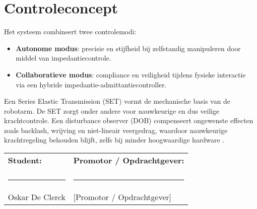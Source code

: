 \documentclass[11pt,a4paper]{article}
\begin{document}
\section*{Controleconcept}
Het systeem combineert twee controlemodi:  

\begin{itemize}
    \item \textbf{Autonome modus}: precisie en stijfheid bij zelfstandig manipuleren door middel van impedantiecontrole.  
    \item \textbf{Collaboratieve modus}: compliance en veiligheid tijdens fysieke interactie via een hybride impedantie-admittantiecontroller.
\end{itemize}

Een Series Elastic Transmission (SET) vormt de mechanische basis van de robotarm. De SET zorgt onder andere voor nauwkeurige en dus veilige krachtcontrole. Een disturbance observer (DOB) compenseert ongewenste effecten zoals backlash, wrijving en niet-lineair veergedrag, waardoor nauwkeurige krachtregeling behouden blijft, zelfs bij minder hoogwaardige hardware \cite{Paine2016_SEA}\cite{Shim2021_DO}.  



\vspace{10mm}

\begin{tabular}{p{} p{}}
\textbf{Student:} & \textbf{Promotor / Opdrachtgever:} \\
\\[20mm] %
\rule{6cm}{0.4pt} & \rule{6cm}{0.4pt} \\ %
Oskar De Clerck & [Promotor / Opdrachtgever] \\
\end{tabular}

\newpage
\printbibliography
\end{document}
